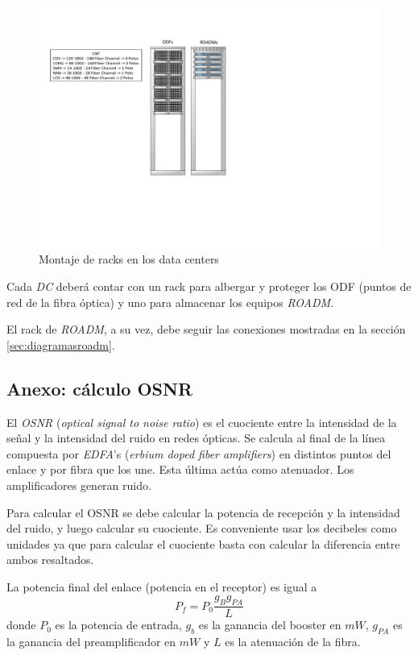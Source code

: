 \begin{figure}[H]
  \centering
  \includegraphics[width=12cm]{Imagenes/racks3.pdf}
  \caption{Montaje de racks en los data centers}
  \label{fig:racks}
\end{figure}

Cada \emph{DC} deberá contar con un rack para albergar y proteger los
ODF (puntos de red de la fibra óptica) y uno para almacenar los
equipos \emph{ROADM}.

El rack de \emph{ROADM}, a su vez, debe seguir las conexiones
mostradas en la sección \ref{sec:diagramasroadm}.

\subsection{Anexo: cálculo OSNR}
\label{sec:osnr}

El \emph{OSNR} (\emph{optical signal to noise ratio}) es el cuociente
entre la intensidad de la señal y la intensidad del ruido en redes
ópticas. Se calcula al final de la línea compuesta por \emph{EDFA}'s
(\emph{erbium doped fiber amplifiers}) en distintos puntos del enlace
y por fibra que los une. Esta última actúa como atenuador. Los
amplificadores generan ruido.

Para calcular el OSNR se debe calcular la potencia de recepción y la
intensidad del ruido, y luego calcular su cuociente. Es conveniente
usar los decibeles como unidades ya que para calcular el cuociente
basta con calcular la diferencia entre ambos resaltados.

La potencia final del enlace (potencia en el receptor) es igual
a $$P_f=P_0\frac{g_Bg_{PA}}{L}$$ donde $P_0$ es la potencia de
entrada, $g_b$ es la ganancia del booster en $mW$, $g_{PA}$ es la
ganancia del preamplificador en $mW$ y $L$ es la atenuación de la
fibra.

